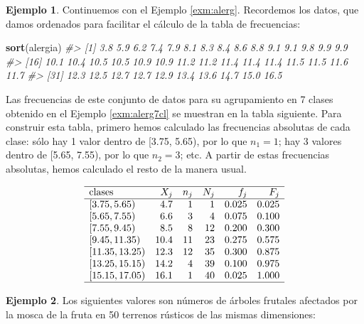 \documentclass[
]{book}
\newenvironment{Shaded}{\begin{snugshade}}{\end{snugshade}}
\newcommand{\CommentTok}[1]{\textcolor[rgb]{0.56,0.35,0.01}{\textit{#1}}}
\newcommand{\KeywordTok}[1]{\textcolor[rgb]{0.13,0.29,0.53}{\textbf{#1}}}
\newcommand{\NormalTok}[1]{#1}
\theoremstyle{definition}
\theoremstyle{definition}
\newtheorem{example}{Ejemplo}[chapter]
\theoremstyle{definition}
\theoremstyle{remark}
\begin{document}
\begin{example}
\protect\hypertarget{exm:table1}{}{\label{exm:table1} }Continuemos con el Ejemplo \ref{exm:alerg}. Recordemos los datos, que damos ordenados para facilitar el cálculo de la tabla de frecuencias:
\end{example}

\begin{Shaded}
\begin{Highlighting}[]
\KeywordTok{sort}\NormalTok{(alergia)}
\CommentTok{\#\textgreater{}  [1]  3.8  5.9  6.2  7.4  7.9  8.1  8.3  8.4  8.6  8.8  9.1  9.1  9.8  9.9  9.9}
\CommentTok{\#\textgreater{} [16] 10.1 10.4 10.5 10.5 10.9 10.9 11.2 11.2 11.4 11.4 11.4 11.5 11.5 11.6 11.7}
\CommentTok{\#\textgreater{} [31] 12.3 12.5 12.7 12.7 12.9 13.4 13.6 14.7 15.0 16.5}
\end{Highlighting}
\end{Shaded}

Las frecuencias de este conjunto de datos para su agrupamiento en 7 clases obtenido en el Ejemplo \ref{exm:alerg7cl} se muestran en la tabla siguiente. Para construir esta tabla, primero hemos calculado las frecuencias absolutas de cada clase: sólo hay 1 valor dentro de {[}3.75, 5.65), por lo que \(n_1=1\); hay 3 valores dentro de {[}5.65, 7.55), por lo que \(n_2=3\); etc. A partir de estas frecuencias absolutas, hemos calculado el resto de la manera usual.

\[
\begin{array}{lrrrrr}
  \hline
\text{clases} & X_j & n_j & N_j & f_j & F_j \\ 
  \hline
\left[3.75, 5.65\right) & 4.7 &   1 &   1 & 0.025 & 0.025 \\ 
\left[5.65, 7.55\right) & 6.6 &   3 &   4 & 0.075 & 0.100 \\ 
\left[7.55, 9.45\right) & 8.5 &   8 &  12 & 0.200 & 0.300 \\ 
\left[9.45, 11.35\right) & 10.4 &  11 &  23 & 0.275 & 0.575 \\ 
\left[11.35, 13.25\right) & 12.3 &  12 &  35 & 0.300 & 0.875 \\ 
\left[13.25, 15.15\right) & 14.2 &   4 &  39 & 0.100 & 0.975 \\ 
\left[15.15, 17.05\right) & 16.1 &   1 &  40 & 0.025 & 1.000 \\ 
   \hline
\end{array}
\]

\begin{example}
\protect\hypertarget{exm:fruitals}{}{\label{exm:fruitals} }Los siguientes valores son números de árboles frutales afectados por la mosca de la fruta en 50 terrenos rústicos de las mismas dimensiones:
\end{example}
\end{document}
